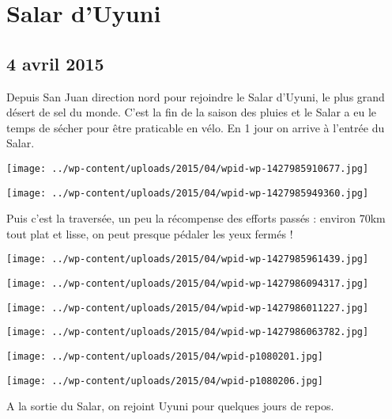 \chapter{Salar d’Uyuni}
\section*{4 avril 2015}
Depuis San Juan direction nord pour rejoindre le Salar d'Uyuni, le plus grand désert de sel du monde. C'est la fin de la saison des pluies et le Salar a eu le temps de sécher pour être praticable en vélo.  \newline
 En 1 jour on arrive à l'entrée du Salar.  \newline
 \newline
\centerline{\texttt{[image: ../wp-content/uploads/2015/04/wpid-wp-1427985910677.jpg]} } 
 \newline
 \newline
\centerline{\texttt{[image: ../wp-content/uploads/2015/04/wpid-wp-1427985949360.jpg]} } 
 \newline
 Puis c'est la traversée, un peu la récompense des efforts passés : environ 70km tout plat et lisse, on peut presque pédaler les yeux fermés ! \newline
 \newline
\centerline{\texttt{[image: ../wp-content/uploads/2015/04/wpid-wp-1427985961439.jpg]} } 
 \newline
 \newline
\centerline{\texttt{[image: ../wp-content/uploads/2015/04/wpid-wp-1427986094317.jpg]} } 
 \newline
 \newline
\centerline{\texttt{[image: ../wp-content/uploads/2015/04/wpid-wp-1427986011227.jpg]} } 
 \newline
 \newline
\centerline{\texttt{[image: ../wp-content/uploads/2015/04/wpid-wp-1427986063782.jpg]} } 
 \newline
 \newline
\centerline{\texttt{[image: ../wp-content/uploads/2015/04/wpid-p1080201.jpg]} } 
 \newline
 \newline
\centerline{\texttt{[image: ../wp-content/uploads/2015/04/wpid-p1080206.jpg]} } 
 \newline
 A la sortie du Salar, on rejoint Uyuni pour quelques jours de repos.  \newline
